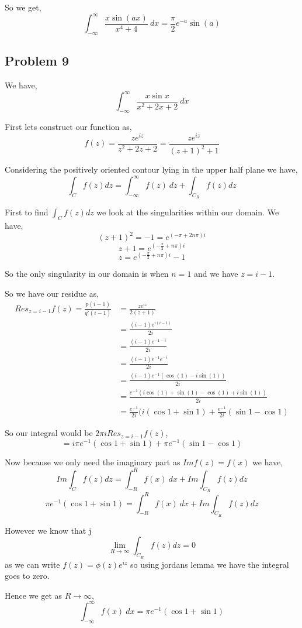 \documentclass[a4paper]{report}
\begin{document}
So we get, 
$$ \int_{{-\infty}}^{{\infty}} {\frac{x\sin(ax)}{x^{4} + 4}} \: d{x} = \frac{\pi}{2}e^{-a}\sin(a) $$



\subsection*{Problem 9}

We have, 
$$ \int_{{-\infty}}^{{\infty}} {\frac{x \sin x}{x^2 + 2x + 2}} \: d{x} {} $$

First lets construct  our function as, 
$$ f(z) = \frac{z e^{iz}}{z^2 + 2z + 2} = \frac{z e^{iz}}{(z+1)^2 + 1}$$ 

Considering the positively oriented contour lying in the upper half plane we have, 
$$ \int_{C} f(z) dz = \int_{{-\infty}}^{{\infty}} {f(z)} \: d{z}  + \int_{C_R} f(z) dz $$ 

First to find $ \int_{C} f(z) dz$ we look at the singularities within our domain. We have, 
$$ (z+1)^2 = -1  = e^{(-\pi + 2n\pi)i}$$ 
$$ z+1 = e^{(-\frac{\pi}{2} + n\pi)i}$$ 
$$ z  = e^{(-\frac{\pi}{2} + n\pi)i} - 1$$ 

So the only singularity in our domain is when $n = 1$ and we have $z = i - 1$.

So we have our residue as,  
\begin{align*}
    Res_{z = i -1} f(z) = \frac{p(i - 1)}{q'(i - 1)} &= \frac{ze^{iz}}{2(z + 1)}\\
                                                     &= \frac{(i - 1)e^{i(i - 1)}}{2i}\\
                                                     &= \frac{(i - 1)e^{-1 - i}}{2i}\\
                                                     &= \frac{(i - 1)e^{-1 }e^{- i}}{2i}\\
                                                     &= \frac{(i - 1)e^{-1 }(\cos(1) - i\sin(1))}{2i}\\
                                                     &= \frac{e^{-1 }(i\cos(1) + \sin(1) - \cos(1) + i \sin(1))}{2i}\\
                                                     &= \frac{e^{-1}}{2i} (i(\cos 1 + \sin 1) + \frac{e^{-1}}{2i}(\sin 1 - \cos 1)
\end{align*}

So our integral would be $2\pi i Res_{z = i - 1} f(z)$,  
$$ = i\pi e^{-1} (\cos 1 + \sin 1) + \pi e^{-1}(\sin 1 - \cos 1) $$ 


Now because we only need the imaginary part as $Im f(z) = f(x)$ we have, 
$$Im \int_C f(z) dz = \int_{{-R}}^{{R}} {f(x)} \: d{x}  + Im \int_{C_R} f(z) dz $$ 
$$ \pi e^{-1}(\cos 1 + \sin 1) = \int_{{-R}}^{{R}} {f(x)} \: d{x}  + Im \int_{C_R} f(z) dz $$ 

However we know that j
$$ \lim_{R \to \infty} \int_{C_R} f(z) dz   = 0$$ 
as we can write $f(z) = \phi(z) e^{iz}$ so using jordans lemma we have the integral goes to zero.

Hence we get as $R \rightarrow \infty$, 
$$ \int_{{-\infty}}^{{\infty}} {f(x)} \: d{x} = \pi e^{-1} (\cos 1 + \sin 1)  $$ 
\end{document}
